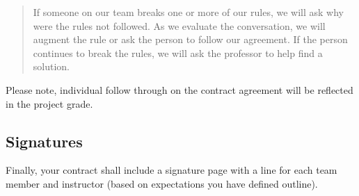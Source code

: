 \documentclass{article}\usepackage[]{graphicx}\usepackage[]{color}
\begin{document}
\begin{quote}
If someone on our team breaks one or more of our rules, we will ask why were the rules not followed. As we evaluate the conversation, we will augment the rule or ask the person to follow our agreement. If the person continues to break the rules, we will ask the professor to help find a solution.
\end{quote}

\noindent Please note, individual follow through on the contract agreement will be reflected in the project grade.

\subsection{Signatures}

Finally, your contract shall include a signature page with a line for each team member and instructor (based on expectations you have defined outline).
\end{document}
